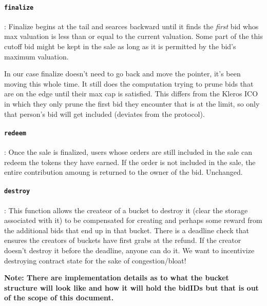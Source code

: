 \documentclass{article}
\begin{document}
\paragraph{\texttt{finalize}}:
Finalize begins at the tail and searces backward until it finds the \emph{first} bid whos max valuation is less than or equal to the current valuation.
Some part of the this cutoff bid might be kept in the sale as long as it is permitted by the bid's maximum valuation.

{ \color{red}
In our case finalize doesn't need to go back and move the pointer, it's been moving this whole time.
It still does the computation trying to prune bids that are on the edge until their max cap is satisfied.
This differs from the Kleros ICO in which they only prune the first bid they encounter that is at the limit, so only that person's bid will get included (deviates from the protocol).
}

\paragraph{\texttt{redeem}}:
Once the sale is finalized, users whose orders are still included in the sale can redeem the tokens they have earned.
If the order is not included in the sale, the entire contribution amoung is returned to the owner of the bid.
{ \color{red}
Unchanged.
}

{\color{red}
\paragraph{\texttt{destroy}}:
This function allows the createor of a bucket to destroy it (clear the storage associated with it) to be compensated for creating and perhaps some reward from the additional bids that end up in that bucket.
There is a deadline check that ensures the creators of buckets have first grabs at the refund.
If the creator doesn't destroy it before the deadline, anyone can do it. 
We want to incentivize destroying contract state for the sake of congestion/bloat!
}

{\bf Note: There are implementation details as to what the bucket structure will look like and how it will hold the bidIDs but that is out of the scope of this document.}

\printbibliography
\end{document}
